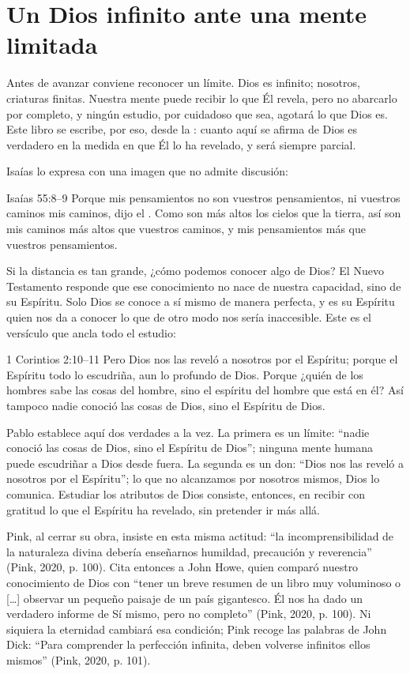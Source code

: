 \section{Un Dios infinito ante una mente limitada}

Antes de avanzar conviene reconocer un límite. Dios es infinito; nosotros, criaturas finitas. Nuestra mente puede recibir lo que Él revela, pero no abarcarlo por completo, y ningún estudio, por cuidadoso que sea, agotará lo que Dios es. Este libro se escribe, por eso, desde la : cuanto aquí se afirma de Dios es verdadero en la medida en que Él lo ha revelado, y será siempre parcial.

Isaías lo expresa con una imagen que no admite discusión:

\begin{verso}{Isaías 55:8–9}
Porque mis pensamientos no son vuestros pensamientos, ni vuestros caminos mis caminos, dijo el \SENOR. Como son más altos los cielos que la tierra, así son mis caminos más altos que vuestros caminos, y mis pensamientos más que vuestros pensamientos.
\end{verso}

Si la distancia es tan grande, ¿cómo podemos conocer algo de Dios? El Nuevo Testamento responde que ese conocimiento no nace de nuestra capacidad, sino de su Espíritu. Solo Dios se conoce a sí mismo de manera perfecta, y es su Espíritu quien nos da a conocer lo que de otro modo nos sería inaccesible. Este es el versículo que ancla todo el estudio:

\begin{verso}{1 Corintios 2:10–11}
Pero Dios nos las reveló a nosotros por el Espíritu; porque el Espíritu todo lo escudriña, aun lo profundo de Dios. Porque ¿quién de los hombres sabe las cosas del hombre, sino el espíritu del hombre que está en él? Así tampoco nadie conoció las cosas de Dios, sino el Espíritu de Dios.
\end{verso}

Pablo establece aquí dos verdades a la vez. La primera es un límite: “nadie conoció las cosas de Dios, sino el Espíritu de Dios”; ninguna mente humana puede escudriñar a Dios desde fuera. La segunda es un don: “Dios nos las reveló a nosotros por el Espíritu”; lo que no alcanzamos por nosotros mismos, Dios lo comunica. Estudiar los atributos de Dios consiste, entonces, en recibir con gratitud lo que el Espíritu ha revelado, sin pretender ir más allá.

Pink, al cerrar su obra, insiste en esta misma actitud: “la incomprensibilidad de la naturaleza divina debería enseñarnos humildad, precaución y reverencia” (Pink, 2020, p. 100). Cita entonces a John Howe, quien comparó nuestro conocimiento de Dios con “tener un breve resumen de un libro muy voluminoso o […] observar un pequeño paisaje de un país gigantesco. Él nos ha dado un verdadero informe de Sí mismo, pero no completo” (Pink, 2020, p. 100). Ni siquiera la eternidad cambiará esa condición; Pink recoge las palabras de John Dick: “Para comprender la perfección infinita, deben volverse infinitos ellos mismos” (Pink, 2020, p. 101).

